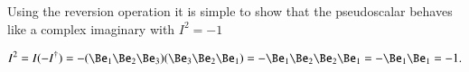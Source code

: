 %
%


Using the reversion operation it is simple to show that the  pseudoscalar
behaves like a complex imaginary with \( I^2 = -1 \)

\begin{dmath}\label{eqn:R3PseudoscalarSquare:10}
I^2
=
I (-I^\dagger)
=
-
(\Be_1 \Be_2 \Be_3)(\Be_3 \Be_2 \Be_1)
=
-
\Be_1 \Be_2 \Be_2 \Be_1
=
-
\Be_1 \Be_1
=
-1.
\end{dmath}
